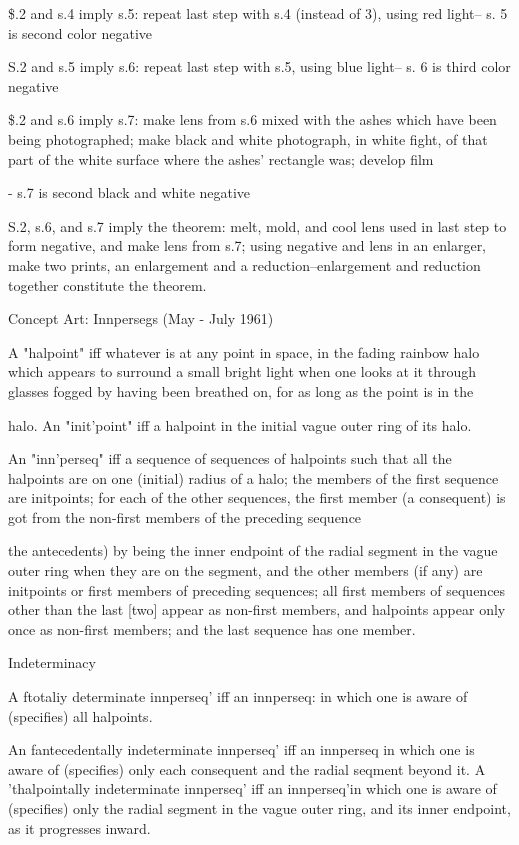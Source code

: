 \documentclass[10pt,twoside]{memoir}
\begin{document}
\begin{enumerate}
{\begin{enumerate}
\begin{sysrules}
\begin{sysrules}
\begin{sysrules}
\begin{sysrules}
{\begin{enumerate}
{{\$.2 and s.4 imply s.5: repeat last step with s.4 (instead of 3), using red 
light-- s. 5 is second color negative 

S.2 and s.5 imply s.6: repeat last step with s.5, using blue light-- s. 6 is third 
color negative 

\$.2 and s.6 imply s.7: make lens from s.6 mixed with the ashes which have 
been being photographed; make black and white photograph, in white fight, 
of that part of the white surface where the ashes' rectangle was; develop film 



- s.7 is second black and white negative 

S.2, s.6, and s.7 imply the theorem: melt, mold, and cool lens used in last 
step to form negative, and make lens from s.7; using negative and lens in an 
enlarger, make two prints, an enlargement and a reduction--enlargement and 
reduction together constitute the theorem. 


Concept Art: Innpersegs (May - July 1961) 

A "halpoint" iff whatever is at any point in space, in the fading rainbow halo 
which appears to surround a small bright light when one looks at it through 
glasses fogged by having been breathed on, for as long as the point is in the 


halo. 
An "init'point" iff a halpoint in the initial vague outer ring of its halo. 


An "inn'perseq" iff a sequence of sequences of halpoints such that all the 
halpoints are on one (initial) radius of a halo; the members of the first 
sequence are initpoints; for each of the other sequences, the first member (a 
consequent) is got from the non-first members of the preceding sequence 
{the antecedents) by being the inner endpoint of the radial segment in the 
vague outer ring when they are on the segment, and the other members (if 
any) are initpoints or first members of preceding sequences; all first members 
of sequences other than the last [two] appear as non-first members, and 
halpoints appear only once as non-first members; and the last sequence has 
one member. 


Indeterminacy 

A ftotaliy determinate innperseq' iff an innperseq: in which one is aware of 
(specifies) all halpoints. 

An fantecedentally indeterminate innperseq' iff an innperseq in which one is 
aware of (specifies) only each consequent and the radial seqment beyond it. 
A 'thalpointally indeterminate innperseq' iff an innperseq'in which one is 
aware of (specifies) only the radial segment in the vague outer ring, and its 
inner endpoint, as it progresses inward. 

}}}
\end{enumerate}}
\end{sysrules}
\end{sysrules}
\end{sysrules}
\end{sysrules}
\end{enumerate}}
\end{enumerate}
\end{document}

